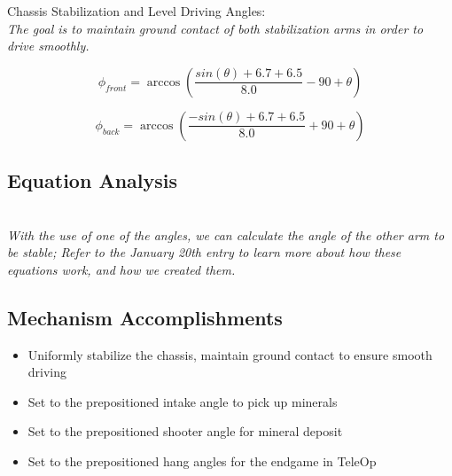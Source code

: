 \vskip 0.25in
Chassis Stabilization and Level Driving Angles: 
\vskip 0.05in
\textit{
\\The goal is to maintain ground contact of both stabilization arms in order to drive smoothly. 
}

\vskip 0.2in
\begin{equation}
\phi_{front} = \arccos(\frac{sin(\theta) + 6.7 + 6.5}{8.0} - 90 + \theta)
\end{equation}

\begin{equation}
\phi_{back} = \arccos(\frac{-sin(\theta) + 6.7 + 6.5}{8.0} + 90 + \theta)
\end{equation}

\subsection*{Equation Analysis}
\textit{
\\ With the use of one of the angles, we can calculate the angle of the other arm to be stable; Refer to the January 20th entry to learn more about how these equations work, and how we created them. 
}


\subsection*{Mechanism Accomplishments}
\begin{itemize}
    \item Uniformly stabilize the chassis, maintain ground contact to ensure smooth driving
    \item Set to the prepositioned intake angle to pick up minerals
    \item Set to the prepositioned shooter angle for mineral deposit 
    \item Set to the prepositioned hang angles for the endgame in TeleOp
\end{itemize} 